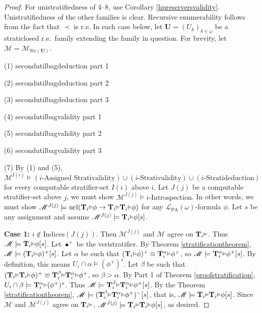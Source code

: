 \documentclass[reqno]{article}
\theoremstyle{definition}
\def\L{\mathscr{L}}
\def\M{\mathscr{M}}
\def\T{\mathbf{T}}
\def\U{\mathbf{U}}
\def\indices{\mathrm{Indices}}
\def\LPA{\L_{\mathrm{PA}}}
\renewcommand{\Pr}[1]{\T_{#1}\mbox{\small${\vDash}$}}
\newcommand{\Prr}[2]{\T^{#1}_{#2}\mbox{\small${\vDash}$}}
\newcommand{\ucl}[1]{\mathrm{ucl}(#1)}
\newcommand{\case}[1]{\textbf{Case #1:}}
\newcommand{\str}[1]{\mathrm{Str}(#1)} \newcommand{\Str}[1]{\str{#1}}
\begin{document}
\begin{proof}
For unistratifiedness of 4--8, use Corollary \ref{hpreserversvalidity}.
Unistratifiedness of the other families is clear.
Recursive enumerability follows from the fact that $\prec$ is r.e.
In each case below, let $\U=(U_k)_{k\in\omega}$ be a straticlosed r.e.~family
extending the family in question. For brevity, let $\M=\M_{\str\U}$.

\item (1) secondutilbagdeduction part 1
\item (2) secondutilbagdeduction part 2
\item (3) secondutilbagdeduction part 3
\item (4) secondutilbagvalidity part 1
\item (5) secondutilbagvalidity part 2
\item (6) secondutilbagvalidity part 3

\item
(7)
By (1) and (5),
$\M^{I(i)}\models(\mbox{$i$-Assigned Strativalidity})
\cup (\mbox{$i$-Strativalidity})
\cup (\mbox{$i$-Stratideduction})$
for every computable stratifier-set
$I(i)$ above $i$.
Let $J(j)$ be a computable stratifier-set above $j$, we must show
$\M^{J(j)}\models \mbox{$i$-Introspection}$.
In other words, we must show $\M^{J(j)}\models \ucl{\Pr i\phi\rightarrow \Pr i\Pr i\phi}$
for any $\LPA(\omega)$-formula $\phi$.
Let $s$ be any assignment and assume $\M^{J(j)}\models \Pr i\phi[s]$.

\item
\case1
$i\not\in\indices(J(j))$.
Then $\M^{J(j)}$ and $\M$ agree on $\Pr i$.
Thus $\M\models \Pr i\phi[s]$.
Let $\bullet^+$ be the veristratifier.
By Theorem \ref{stratificationtheorem},
$\M\models (\Pr i\phi)^+[s]$.
Let $\alpha$ be such that $(\Pr i\phi)^+\equiv \Prr\alpha i\phi^+$,
so $\M\models\Prr\alpha i\phi^+[s]$.
By definition, this means $U_i\cap\alpha\models (\phi^+)^s$.
Let $\beta$ be such that $(\Pr i\Pr i\phi)^+\equiv \Prr\beta i \Prr\alpha i\phi^+$,
so $\beta>\alpha$.
By Part 1 of Theorem \ref{proofstratification},
$U_i\cap\beta\models\Prr\alpha i (\phi^+)^s$.
Thus $\M\models \Prr\beta i\Prr\alpha i \phi^+[s]$.
By the Theorem \ref{stratificationtheorem},
$\M\models (\Prr\beta i\Prr\alpha i\phi^+)^-[s]$, that is,
$\M\models \Pr i\Pr i\phi[s]$. Since $\M$ and $\M^{J(j)}$ agree on $\Pr i$,
$\M^{J(j)}\models \Pr i\Pr i\phi[s]$, as desired.


\end{proof}
\end{document}
